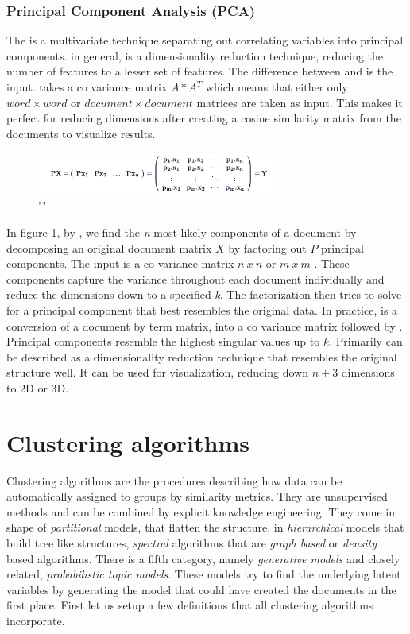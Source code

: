     \subsubsection{Principal Component Analysis (PCA)}
    \label{sec:pca}

    The \pcafull{} is a multivariate technique separating out correlating variables into principal components. \pca{} in general, is a dimensionality reduction technique, reducing the number of features to a lesser set of features. The difference between \pca{} and \lsa{} is the input. \pca{} takes a co variance matrix $A*A^{T}$ which means that either only $word \times word$ or $document \times document$ matrices are taken as input. This makes it perfect for reducing dimensions after creating a cosine similarity matrix from the documents to visualize results.

    \begin{figure}[h!]
      \centering
        \includegraphics[width=0.7\textwidth]{PCA.png}
        \caption{"\pcafull{}"}
        \label{pca}
    \end{figure}

    In figure \ref{pca}, by \cite{PCA2009}, we find the \emph{n} most likely components of a document by decomposing an original document matrix $X$ by factoring out $P$ principal components. The input is a co variance matrix $n\:x\:n$ or $m\:x\:m$ . These components capture the variance throughout each document individually and reduce the dimensions down to a specified \emph{k}. The factorization then tries to solve for a principal component that best resembles the original data. In practice, \pca{} is a conversion of a document by term matrix, into a co variance matrix followed by \svd{}. Principal components resemble the highest singular values up to $k$. Primarily \pca{} can be described as a dimensionality reduction technique that resembles the original structure well. It can be used for visualization, reducing down $n + 3$ dimensions to 2D or 3D. \cite{PCA2009}

\section{Clustering algorithms}
\label{sec:clustering}
  
  Clustering algorithms are the procedures describing how data can be automatically assigned to groups by similarity metrics. They are unsupervised methods and can be combined by explicit knowledge engineering. They come in shape of \emph{partitional} models, that flatten the structure, in \emph{hierarchical} models that build tree like structures, \emph{spectral} algorithms that are \emph{graph based} or \emph{density} based algorithms. There is a fifth category, namely \emph{generative models} and closely related, \emph{probabilistic topic models}. These models try to find the underlying latent variables by generating the model that could have created the documents in the first place. First let us setup a few definitions that all clustering algorithms incorporate.

